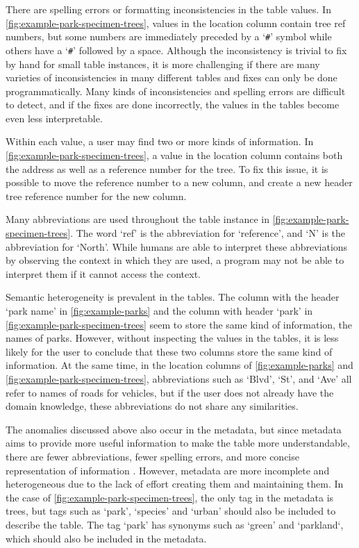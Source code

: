 There are spelling errors or formatting inconsistencies in the table values. In \autoref{fig:example-park-specimen-trees}, values in the location column contain tree ref numbers, but some numbers are immediately preceded by a `\verb+#+' symbol while others have a `\verb+#+' followed by a space. Although the inconsistency is trivial to fix by hand for small table instances, it is more challenging if there are many varieties of inconsistencies in many different tables and fixes can only be done programmatically. Many kinds of inconsistencies and spelling errors are difficult to detect, and if the fixes are done incorrectly, the values in the tables become even less interpretable.

Within each value, a user may find two or more kinds of information. In \autoref{fig:example-park-specimen-trees}, a value in the location column contains both the address as well as a reference number for the tree. To fix this issue, it is possible to move the reference number to a new column, and create a new header tree reference number for the new column.

Many abbreviations are used throughout the table instance in \autoref{fig:example-park-specimen-trees}. The word `ref' is the abbreviation for `reference', and `N' is the abbreviation for `North'. While humans are able to interpret these abbreviations by observing the context in which they are used, a program may not be able to interpret them if it cannot access the context.

Semantic heterogeneity is prevalent in the tables. The column with the header `park name' in \autoref{fig:example-parks} and the column with header `park' in \autoref{fig:example-park-specimen-trees} seem to store the same kind of information, the names of parks. However, without inspecting the values in the tables, it is less likely for the user to conclude that these two columns store the same kind of information. At the same time, in the location columns of \autoref{fig:example-parks} and \autoref{fig:example-park-specimen-trees}, abbreviations such as `Blvd', `St', and `Ave' all refer to names of roads for vehicles, but if the user does not already have the domain knowledge, these abbreviations do not share any similarities.

The anomalies discussed above also occur in the metadata, but since metadata aims to provide more useful information to make the table more understandable, there are fewer abbreviations, fewer spelling errors, and more concise representation of information \cite{Rahm2016Case}. However, metadata are more incomplete and heterogeneous due to the lack of effort creating them and maintaining them. In the case of \autoref{fig:example-park-specimen-trees}, the only tag in the metadata is trees, but tags such as `park', `species' and `urban' should also be included to describe the table. The tag `park' has synonyms such as `green' and `parkland`, which should also be included in the metadata.

